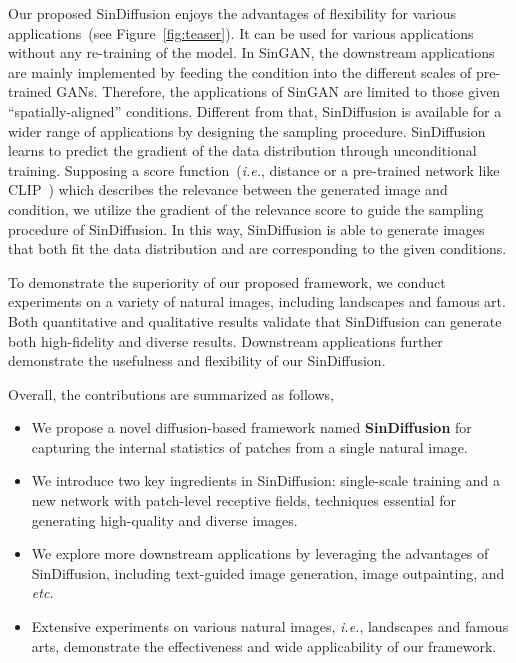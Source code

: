 \documentclass[10pt,twocolumn,letterpaper]{article}
\begin{document}
Our proposed SinDiffusion enjoys the advantages of flexibility for various applications~(see Figure~\ref{fig:teaser}). It can be used for various applications without any re-training of the model.
In SinGAN, the downstream applications are mainly implemented by feeding the condition into the different scales of pre-trained GANs.
Therefore, the applications of SinGAN are limited to those given ``spatially-aligned'' conditions.
Different from that, SinDiffusion is available for a wider range of applications by designing the sampling procedure.
SinDiffusion learns to predict the gradient of the data distribution through unconditional training.
Supposing a score function~(\emph{i.e.},  distance or a pre-trained network like CLIP~\cite{radford2021learning}) which describes the relevance between the generated image and condition, we utilize the gradient of the relevance score to guide the sampling procedure of SinDiffusion.
In this way, SinDiffusion is able to generate images that both fit the data distribution and are corresponding to the given conditions.

To demonstrate the superiority of our proposed framework, we conduct experiments on a variety of natural images, including landscapes and famous art.
Both quantitative and qualitative results validate that SinDiffusion can generate both high-fidelity and diverse results.
Downstream applications further demonstrate the usefulness and flexibility of our SinDiffusion.

Overall, the contributions are summarized as follows,
\begin{itemize}
    \item We propose a novel diffusion-based framework named \textbf{SinDiffusion} for capturing the internal statistics of patches from a single natural image.
    \vspace{-2mm} \item We introduce two key ingredients in SinDiffusion: single-scale training and a new network with patch-level receptive fields, techniques essential for generating high-quality and diverse images.
    \vspace{-2mm} \item We explore more downstream applications by leveraging the advantages of SinDiffusion, including text-guided image generation, image outpainting, and \emph{etc.}
    \vspace{-6.1mm} \item Extensive experiments on various natural images, \emph{i.e.}, landscapes and famous arts, demonstrate the effectiveness and wide applicability of our framework.
\end{itemize}
\end{document}

